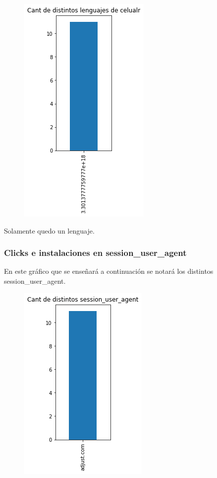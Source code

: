 \documentclass[a4paper, 12pt]{article}
\newcommand\tab[1][1cm]{\hspace*{#1}}
\begin{document}
{{	\FloatBarrier
		\begin{figure}[h]
			\centering
			\includegraphics[scale = 0.5]{images/clicks-installs/device_language.png}
			\caption{}
		\end{figure}
	\FloatBarrier

	\tab Solamente quedo un lenguaje.
	
	\subsubsection{Clicks e instalaciones en session\_user\_agent}
	\tab En este gráfico que se enseñará a continuación se notará los distintos session\_user\_agent.
	
	\FloatBarrier
		\begin{figure}[h]
			\centering
			\includegraphics[scale = 0.5]{images/clicks-installs/session_user_agent.png}
			\caption{}
		\end{figure}
	\FloatBarrier
	
}}
\end{document}
